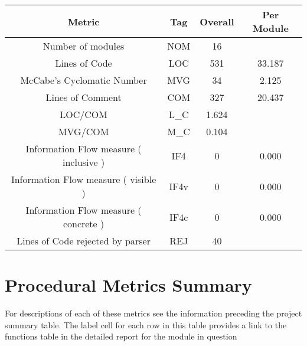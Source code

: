 \begin{tabular}{|c|c|c|c|}
\hline 
Metric &Tag &Overall &Per Module \\
 \hline 
Number of modules &NOM & 16 &  \\
 \hline 
Lines of Code &LOC & 531 & 33.187 \\

 \hline 
McCabe's Cyclomatic Number &MVG & 34 & 2.125 \\

 \hline 
Lines of Comment &COM & 327 & 20.437 \\ 

 \hline 
LOC/COM &L\_C & 1.624 &  \\
 \hline 
MVG/COM &M\_C & 0.104 &  \\
 \hline 
Information Flow measure (  inclusive ) &IF4 & 0 & 0.000 \\
 \hline 
Information Flow measure (  visible ) &IF4v & 0 & 0.000 \\
 \hline 
Information Flow measure (  concrete ) &IF4c& 0 & 0.000 \\
 \hline 
Lines of Code rejected by parser &REJ & 40 &  \\
 \hline 

\end{tabular}



\section{Procedural Metrics Summary}
 For descriptions of each of these metrics see the information preceding the project summary table. The label cell for each row in this
table provides a link to the functions table in the detailed report for the module in question\\

